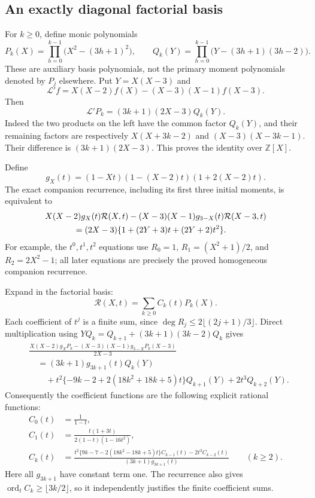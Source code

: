 \documentclass[11pt,letterpaper]{article}
\numberwithin{equation}{section}
\begin{document}
\subsection{An exactly diagonal factorial basis}
For $k\ge0$, define monic polynomials
\[
 P_k(X)=\prod_{h=0}^{k-1}\bigl(X^2-(3h+1)^2\bigr),\qquad
 Q_k(Y)=\prod_{h=0}^{k-1}\bigl(Y-(3h+1)(3h-2)\bigr).
\]
These are auxiliary basis polynomials, not the primary moment
polynomials denoted by $P_j$ elsewhere. Put $Y=X(X-3)$ and
\[
 \mathcal L'f=X(X-2)f(X)-(X-3)(X-1)f(X-3).
\]
Then
\begin{equation}\label{VIII-eq:e-exact-diagonal-basis}
 \mathcal L'P_k=(3k+1)(2X-3)Q_k(Y).
\end{equation}
Indeed the two products on the left have the common factor $Q_k(Y)$,
and their remaining factors are respectively
$X(X+3k-2)$ and $(X-3)(X-3k-1)$. Their difference is
$(3k+1)(2X-3)$. This proves the identity over $\mathbb Z[X]$.

Define
\[
 g_X(t)=(1-Xt)(1-(X-2)t)(1+2(X-2)t).
\]
The exact companion recurrence, including its first three initial
moments, is equivalent to
\begin{equation}\label{VIII-eq:e-full-generating-operator}
 \begin{split}
 &X(X-2)g_X(t)\mathcal R(X,t)
 -(X-3)(X-1)g_{3-X}(t)\mathcal R(X-3,t)\\
 &\hspace{12mm}=(2X-3)\{1+(2Y+3)t+(2Y+2)t^2\}.
 \end{split}
\end{equation}
For example, the $t^0,t^1,t^2$ equations use
$R_0=1$, $R_1=(X^2+1)/2$, and $R_2=2X^2-1$; all later
equations are precisely the proved homogeneous companion recurrence.

Expand in the factorial basis:
\[
 \mathcal R(X,t)=\sum_{k\ge0}C_k(t)P_k(X).
\]
Each coefficient of $t^j$ is a finite sum, since
$\deg R_j\le2\lfloor(2j+1)/3\rfloor$.
Direct multiplication using
$YQ_k=Q_{k+1}+(3k+1)(3k-2)Q_k$ gives
\begin{align*}
 &\frac{X(X-2)g_XP_k-(X-3)(X-1)g_{3-X}P_k(X-3)}{2X-3}\\
 &\quad=(3k+1)g_{3k+1}(t)Q_k(Y)\\
 &\qquad+t^2\{-9k-2+2(18k^2+18k+5)t\}Q_{k+1}(Y)
                  +2t^3Q_{k+2}(Y).
\end{align*}
Consequently the coefficient functions are the following explicit
rational functions:
\begin{equation}\label{VIII-eq:e-factorial-coefficient-recurrence}
 \begin{split}
 C_0(t)&=\frac1{1-t},\\
 C_1(t)&=\frac{t(1+3t)}{2(1-t)(1-16t^2)},\\
 C_k(t)&=
 \frac{t^2\{9k-7-2(18k^2-18k+5)t\}C_{k-1}(t)-2t^3C_{k-2}(t)}
 {(3k+1)g_{3k+1}(t)}\qquad(k\ge2).
 \end{split}
\end{equation}
Here all $g_{3k+1}$ have constant term one. The recurrence also gives
$\operatorname{ord}_t C_k\ge\lfloor3k/2\rfloor$, so it independently
justifies the finite coefficient sums.
\end{document}
